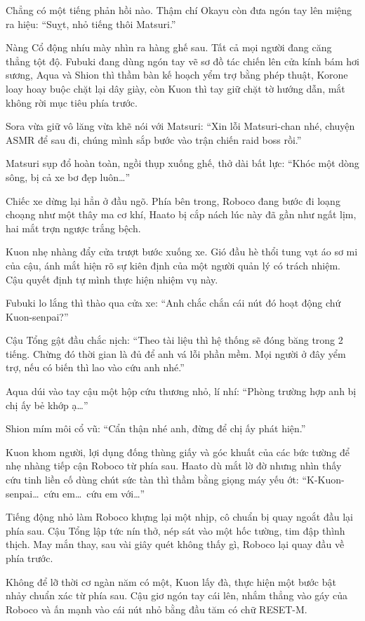 \documentclass[../main.tex]{subfiles}
\begin{document}
Chẳng có một tiếng phản hồi nào. Thậm chí Okayu còn đưa ngón tay lên miệng ra hiệu: ``Suỵt, nhỏ tiếng thôi Matsuri.''

Nàng Cổ động nhíu mày nhìn ra hàng ghế sau. Tất cả mọi người đang căng thẳng tột độ. Fubuki đang dùng ngón tay vẽ sơ đồ tác chiến lên cửa kính bám hơi sương, Aqua và Shion thì thầm bàn kế hoạch yểm trợ bằng phép thuật, Korone loay hoay buộc chặt lại dây giày, còn Kuon thì tay giữ chặt tờ hướng dẫn, mắt không rời mục tiêu phía trước.

Sora vừa giữ vô lăng vừa khẽ nói với Matsuri: ``Xin lỗi Matsuri-chan nhé, chuyện ASMR để sau đi, chúng mình sắp bước vào trận chiến raid boss rồi.''

Matsuri sụp đổ hoàn toàn, ngồi thụp xuống ghế, thở dài bất lực: ``Khóc một dòng sông, bị cả xe bơ đẹp luôn\dots''

Chiếc xe dừng lại hẳn ở đầu ngõ. Phía bên trong, Roboco đang bước đi loạng choạng như một thây ma cơ khí, Haato bị cắp nách lúc này đã gần như ngất lịm, hai mắt trợn ngược trắng bệch.

Kuon nhẹ nhàng đẩy cửa trượt bước xuống xe. Gió đầu hè thổi tung vạt áo sơ mi của cậu, ánh mắt hiện rõ sự kiên định của một người quản lý có trách nhiệm. Cậu quyết định tự mình thực hiện nhiệm vụ này.

Fubuki lo lắng thì thào qua cửa xe: ``Anh chắc chắn cái nút đó hoạt động chứ Kuon-senpai?''

Cậu Tổng gật đầu chắc nịch: ``Theo tài liệu thì hệ thống sẽ đóng băng trong 2 tiếng. Chừng đó thời gian là đủ để anh vá lỗi phần mềm. Mọi người ở đây yểm trợ, nếu có biến thì lao vào cứu anh nhé.''

Aqua dúi vào tay cậu một hộp cứu thương nhỏ, lí nhí: ``Phòng trường hợp anh bị chị ấy bẻ khớp ạ\dots''

Shion mím môi cổ vũ: ``Cẩn thận nhé anh, đừng để chị ấy phát hiện.''

Kuon khom người, lợi dụng đống thùng giấy và góc khuất của các bức tường để nhẹ nhàng tiếp cận Roboco từ phía sau. Haato dù mắt lờ đờ nhưng nhìn thấy cứu tinh liền cố dùng chút sức tàn thì thầm bằng giọng máy yếu ớt: ``K-Kuon-senpai\dots\ cứu em\dots\ cứu em với\dots''

Tiếng động nhỏ làm Roboco khựng lại một nhịp, cô chuẩn bị quay ngoắt đầu lại phía sau. Cậu Tổng lập tức nín thở, nép sát vào một hốc tường, tim đập thình thịch. May mắn thay, sau vài giây quét không thấy gì, Roboco lại quay đầu về phía trước.

Không để lỡ thời cơ ngàn năm có một, Kuon lấy đà, thực hiện một bước bật nhảy chuẩn xác từ phía sau. Cậu giơ ngón tay cái lên, nhắm thẳng vào gáy của Roboco và ấn mạnh vào cái nút nhỏ bằng đầu tăm có chữ RESET-M.
\end{document}
